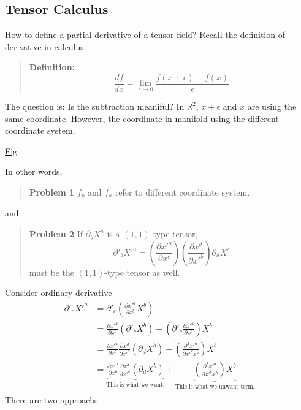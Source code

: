 \subsection{Tensor Calculus} %

How to define a partial derivative of a tensor field? Recall the definition of derivative in calculus:

\begin{quote}
	\textbf{Definition:}
\begin{equation}
\frac{df}{dx} = \lim_{\epsilon\to0}\frac{f(x+\epsilon) - f(x)}{\epsilon}
\end{equation}

\end{quote}
The question is: Is the subtraction meaniful? In $\mathbb{R}^{2}$, $x+\epsilon$ and $x$ are using the same coordinate. However, the coordinate in manifold using the different coordinate system.

\underline{Fig}

In other words,

\begin{quote}
	\textbf{Problem 1}
$f_{p}$ and $f_{a}$ refer to different coordinate system.
\end{quote}

and 

\begin{quote}
	\textbf{Problem 2}
If $\partial_b X^{a}$ is a $(1,1)$-type tensor,
\begin{equation}
\partial'_{b} X'^{a} = \left(\frac{\partial x'^{a}}{\partial x^{c}}\right)\left(\frac{\partial x^{d}}{\partial x'^{b}}\right) \partial_{d}X^{c}
\end{equation}
must be the $(1,1)$-type tensor as well.
\end{quote}

Consider ordinary derivative
\begin{equation}
\begin{aligned}
\partial'_{c} X'^{a}
&= \partial'_{c}\left(\frac{\partial x'^{a}}{\partial x^{b}}X^{b}\right)\\
&= \frac{\partial x'^{a}}{\partial x^{b}}\left(\partial'_{c}X^{b}\right)
+ \left(\partial'_{c}\frac{\partial x'^{a}}{\partial x^{b}}\right)X^{b}\\
&= \frac{\partial x'^{a}}{\partial x^{b}}\frac{\partial x^{d}}{\partial x'^{c}}\left(\partial_{d}X^{b}\right)
+ \left(\frac{\partial^2 x'^{a}}{\partial x'^{c}x^{b}}\right)X^{b}\\
&= \underbrace{\frac{\partial x'^{a}}{\partial x^{b}}\frac{\partial x^{d}}{\partial x'^{c}}\left(\partial_{d}X^{b}\right)}_{\text{This is what we want.}}
+ \underbrace{\left(\frac{\partial^2 x'^{a}}{\partial x'^{c}x^{b}}\right)X^{b}}_{\text{This is what we unwant term.}}\\
\end{aligned}
\end{equation}
There are two approachs 

